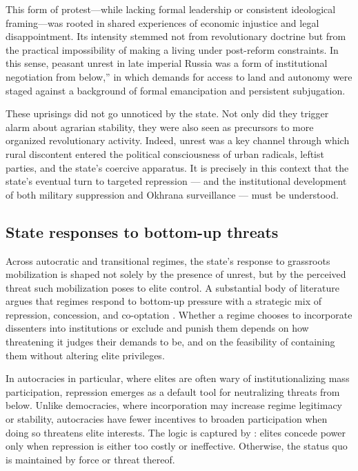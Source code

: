 \documentclass[11pt]{scrarticle}
\begin{document}
This form of protest—while lacking formal leadership or consistent ideological framing—was rooted in shared experiences of economic injustice and legal disappointment. Its intensity stemmed not from revolutionary doctrine but from the practical impossibility of making a living under post-reform constraints. In this sense, peasant unrest in late imperial Russia was a form of institutional negotiation from below,” in which demands for access to land and autonomy were staged against a background of formal emancipation and persistent subjugation.

These uprisings did not go unnoticed by the state. Not only did they trigger alarm about agrarian stability, they were also seen as precursors to more organized revolutionary activity. Indeed, unrest was a key channel through which rural discontent entered the political consciousness of urban radicals, leftist parties, and the state’s coercive apparatus. It is precisely in this context that the state’s eventual turn to targeted repression — and the institutional development of both military suppression and Okhrana surveillance — must be understood.

\subsection{State responses to bottom-up threats}

Across autocratic and transitional regimes, the state’s response to grassroots mobilization is shaped not solely by the presence of unrest, but by the perceived threat such mobilization poses to elite control. A substantial body of literature argues that regimes respond to bottom-up pressure with a strategic mix of repression, concession, and co-optation \parencite{tilly_mobilization_1978,davenport_state_2007,gandhi_authoritarian_2007}. Whether a regime chooses to incorporate dissenters into institutions or exclude and punish them depends on how threatening it judges their demands to be, and on the feasibility of containing them without altering elite privileges.

In autocracies in particular, where elites are often wary of institutionalizing mass participation, repression emerges as a default tool for neutralizing threats from below. Unlike democracies, where incorporation may increase regime legitimacy or stability, autocracies have fewer incentives to broaden participation when doing so threatens elite interests. The logic is captured by \cite{acemoglu_economic_2005}: elites concede power only when repression is either too costly or ineffective. Otherwise, the status quo is maintained by force or threat thereof.
\end{document}
